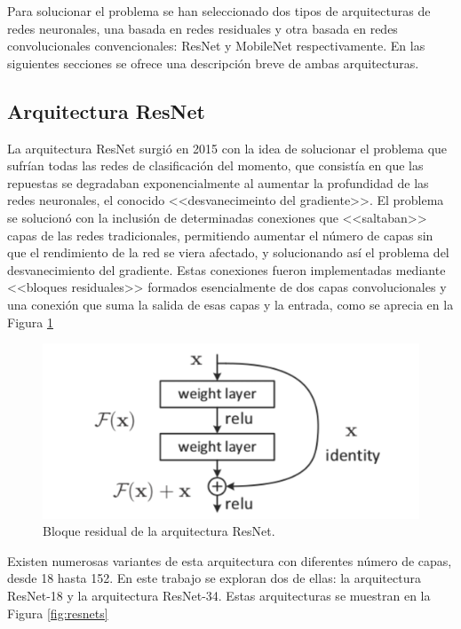 Para solucionar el problema se han seleccionado dos tipos de arquitecturas de redes neuronales, una basada en redes residuales y otra basada en redes convolucionales convencionales: ResNet y MobileNet respectivamente. En las siguientes secciones se ofrece una descripción breve de ambas arquitecturas.

\subsection{Arquitectura ResNet}
\label{sec:resnet}

La arquitectura ResNet surgió en 2015 \cite{resnet} con la idea de solucionar el problema que sufrían todas las redes de clasificación del momento, que consistía en que las repuestas se degradaban exponencialmente al aumentar la profundidad de las redes neuronales, el conocido <<desvanecimeinto del gradiente>>. El problema se solucionó con la inclusión de determinadas conexiones que <<saltaban>> capas de las redes tradicionales, permitiendo aumentar el número de capas sin que el rendimiento de la red se viera afectado, y solucionando así el problema del desvanecimiento del gradiente. Estas conexiones fueron implementadas mediante <<bloques residuales>> formados esencialmente de dos capas convolucionales y una conexión que suma la salida de esas capas y la entrada, como se aprecia en la Figura \ref{fig:residualblock}

\begin{figure}
  \centering
  \includegraphics[width=1\linewidth]{img/residualblock.png}
  \caption{Bloque residual de la arquitectura ResNet.}
  \label{fig:residualblock}
\end{figure}

Existen numerosas variantes de esta arquitectura con diferentes número de capas, desde 18 hasta 152. En este trabajo se exploran dos de ellas: la arquitectura ResNet-18 y la arquitectura ResNet-34. Estas arquitecturas se muestran en la Figura \ref{fig:resnets}

